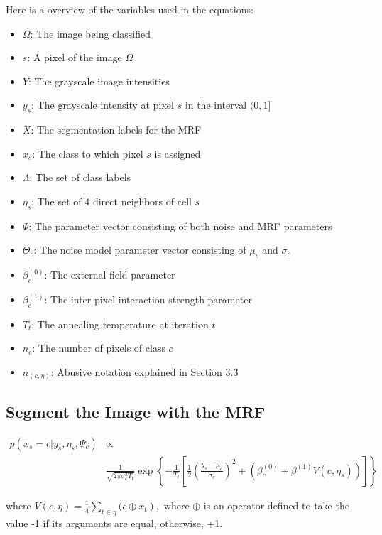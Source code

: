 \documentclass[11pt]{article}
\begin{document}
Here is a overview of the variables used in the equations:

\begin{itemize}
	\item $\Omega$: The image being classified
	\item $s$: A pixel of the image $\Omega$
	\item $Y$: The grayscale image intensities
	\item $y_{s}$: The grayscale intensity at pixel $s$ in the interval $(0,1]$
	\item $X$: The segmentation labels for the MRF
	\item $x_{s}$: The class to which pixel $s$ is assigned
	\item $\Lambda$: The set of class labels
	\item $\eta_{s}$: The set of 4 direct neighbors of cell $s$
	\item $\Psi$: The parameter vector consisting of both noise and MRF parameters
	\item $\Theta_{c}$: The noise model parameter vector consisting of $\mu_{c}$ and $\sigma_{c}$
	\item $\beta_{c}^{(0)}$: The external field parameter
	\item $\beta_{c}^{(1)}$: The inter-pixel interaction strength parameter
	\item $T_{t}$: The annealing temperature at iteration $t$
	\item $n_{c}$: The number of pixels of class $c$
	\item $n_{(c, \eta)}$: Abusive notation explained in Section 3.3
\end{itemize}



\subsection{Segment the Image with the MRF}
\begin{equation}
\begin{aligned}
p\left(x_{s} = c | y_{s}, \eta_{s}, \Psi_{c}\right) & \propto \\
&\frac{1}{\sqrt{2 \pi \sigma_{c}^{2} T_{t}}} \exp \left\{ -\frac{1}{T_{t}} \left[\frac{1}{2} \left(\frac{y_{s}-\mu_{c}}{\sigma_{c}}\right)^{2} + \left( \beta_{c}^{(0)} + \beta^{(1)} V(c, \eta_{s}) \right) \right] \right\}
\end{aligned}
\end{equation}

where $V(c, \eta)=\frac{1}{4} \sum_{t \in \eta}(c \oplus\left.x_{t}\right),$ where $\oplus$ is an operator defined to take the value -1 if its arguments are equal, otherwise, +1.
\end{document}
